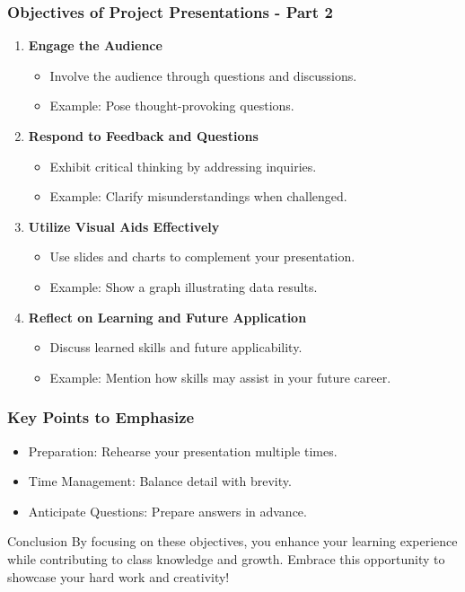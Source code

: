 \documentclass[aspectratio=169]{beamer}
\begin{document}
\begin{frame}[fragile]
    \frametitle{Objectives of Project Presentations - Part 2}
    \begin{enumerate}[resume]
        \item \textbf{Engage the Audience}
        \begin{itemize}
            \item Involve the audience through questions and discussions.
            \item Example: Pose thought-provoking questions.
        \end{itemize}
        
        \item \textbf{Respond to Feedback and Questions}
        \begin{itemize}
            \item Exhibit critical thinking by addressing inquiries.
            \item Example: Clarify misunderstandings when challenged.
        \end{itemize}
        
        \item \textbf{Utilize Visual Aids Effectively}
        \begin{itemize}
            \item Use slides and charts to complement your presentation.
            \item Example: Show a graph illustrating data results.
        \end{itemize}
        
        \item \textbf{Reflect on Learning and Future Application}
        \begin{itemize}
            \item Discuss learned skills and future applicability.
            \item Example: Mention how skills may assist in your future career.
        \end{itemize}
    \end{enumerate}
\end{frame}

\begin{frame}[fragile]
    \frametitle{Key Points to Emphasize}
    \begin{itemize}
        \item Preparation: Rehearse your presentation multiple times.
        \item Time Management: Balance detail with brevity.
        \item Anticipate Questions: Prepare answers in advance.
    \end{itemize}
    
    \begin{block}{Conclusion}
    By focusing on these objectives, you enhance your learning experience while contributing to class knowledge and growth. Embrace this opportunity to showcase your hard work and creativity!
    \end{block}
\end{frame}
\end{document}
